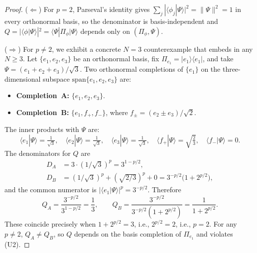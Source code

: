 \documentclass[12pt]{article}
\begin{document}
\begin{proof}
($\Leftarrow$) For $p = 2$, Parseval's identity gives $\sum_j |\langle\phi_j|\Psi\rangle|^2 = \|\Psi\|^2 = 1$ in every orthonormal basis, so the denominator is basis-independent and $Q = |\langle\phi|\Psi\rangle|^2 = \langle\Psi|\Pi_\phi|\Psi\rangle$ depends only on $(\Pi_\phi, \Psi)$.

($\Rightarrow$) For $p \neq 2$, we exhibit a concrete $N = 3$ counterexample that embeds in any $N \geq 3$. Let $\{e_1, e_2, e_3\}$ be an orthonormal basis, fix $\Pi_{e_1} = |e_1\rangle\langle e_1|$, and take $\Psi = (e_1 + e_2 + e_3)/\sqrt{3}$. Two orthonormal completions of $\{e_1\}$ on the three-dimensional subspace $\mathrm{span}\{e_1, e_2, e_3\}$ are:
\begin{itemize}
    \item \textbf{Completion~A:} $\{e_1, e_2, e_3\}$.
    \item \textbf{Completion~B:} $\{e_1, f_+, f_-\}$, where $f_\pm = (e_2 \pm e_3)/\sqrt{2}$.
\end{itemize}
The inner products with $\Psi$ are:
\begin{equation}
    \langle e_1|\Psi\rangle = \tfrac{1}{\sqrt{3}}, \quad \langle e_2|\Psi\rangle = \tfrac{1}{\sqrt{3}}, \quad \langle e_3|\Psi\rangle = \tfrac{1}{\sqrt{3}}, \quad \langle f_+|\Psi\rangle = \sqrt{\tfrac{2}{3}}, \quad \langle f_-|\Psi\rangle = 0.
\end{equation}
The denominators for $Q$ are
\begin{align}
    D_A &= 3 \cdot (1/\sqrt{3})^p = 3^{1 - p/2}, \\
    D_B &= (1/\sqrt{3})^p + (\sqrt{2/3})^p + 0 = 3^{-p/2}\bigl(1 + 2^{p/2}\bigr),
\end{align}
and the common numerator is $|\langle e_1|\Psi\rangle|^p = 3^{-p/2}$. Therefore
\begin{equation}
    Q_A = \frac{3^{-p/2}}{3^{1 - p/2}} = \frac{1}{3},
    \qquad
    Q_B = \frac{3^{-p/2}}{3^{-p/2}(1 + 2^{p/2})} = \frac{1}{1 + 2^{p/2}}.
\end{equation}
These coincide precisely when $1 + 2^{p/2} = 3$, i.e., $2^{p/2} = 2$, i.e., $p = 2$. For any $p \neq 2$, $Q_A \neq Q_B$, so $Q$ depends on the basis completion of $\Pi_{e_1}$ and violates (U2).
\end{proof}
\end{document}
